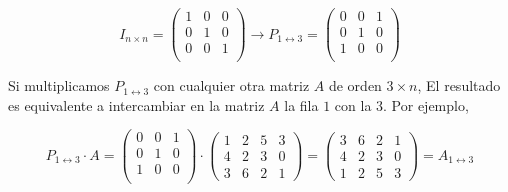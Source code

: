 \begin{equation*}
I_{n \times n}=\begin{pmatrix}
1& 0& 0\\
0& 1& 0\\
0& 0& 1\\
\end{pmatrix} \rightarrow P_{1 \leftrightarrow 3}= \begin{pmatrix}
0& 0& 1\\
0& 1& 0\\
1& 0& 0\\
\end{pmatrix}
\end{equation*}
\begin{paracol}{2}
Si multiplicamos $P_{1 \leftrightarrow 3}$ con cualquier otra matriz $A$ de orden $3\times n$, El resultado es equivalente a intercambiar en la matriz $A$ la fila $1$ con la $3$. Por ejemplo,
\end{paracol}
\begin{equation*}
P_{1\leftrightarrow 3}\cdot A=\begin{pmatrix}
0& 0& 1\\
0& 1& 0\\
1& 0& 0\\
\end{pmatrix} \cdot \begin{pmatrix}
1& 2& 5& 3\\
4& 2& 3& 0\\
3& 6& 2& 1
\end{pmatrix} = \begin{pmatrix}
3& 6& 2& 1\\
4& 2& 3& 0\\
1& 2& 5& 3
\end{pmatrix}= A_{1\leftrightarrow 3}
\end{equation*}




